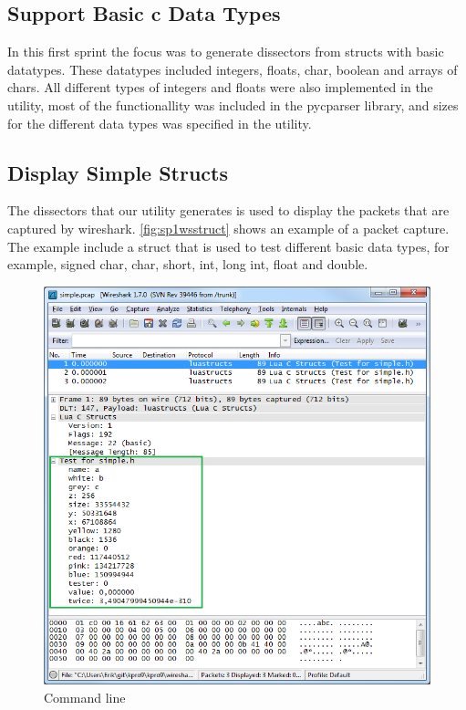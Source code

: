 \subsection{Support Basic \Gls{c} Data Types}
In this first sprint the focus was to generate \glspl{dissector} from \glspl{struct} with 
basic datatypes. These datatypes included \glspl{integer}, \glspl{float}, \gls{char}, \gls{boolean} and 
\glspl{array} of \glspl{char}. All different types of \glspl{integer} and \glspl{float} were also 
implemented in the \gls{utility}, most of the functionallity was included in the 
\gls{pycparser} \gls{library}, and sizes for the different data types was specified in the 
\gls{utility}.

\subsection{Display Simple Structs}
The \glspl{dissector} that our \gls{utility} generates is used to display the \glspl{packet} that 
are captured by wireshark. \autoref{fig:sp1wsstruct} shows an example of a 
\gls{packet} capture. The example include a \gls{struct} that is used to test different 
basic data types, for example, signed \gls{char}, \gls{char}, short, \gls{int}, long \gls{int}, \gls{float} 
and \gls{double}.

\begin{figure}[ht]
	\includegraphics[width=\textwidth]{./sprints/img/wireshark_simple}
	\caption{Command line\label{fig:sp1wsstruct}}
\end{figure}

